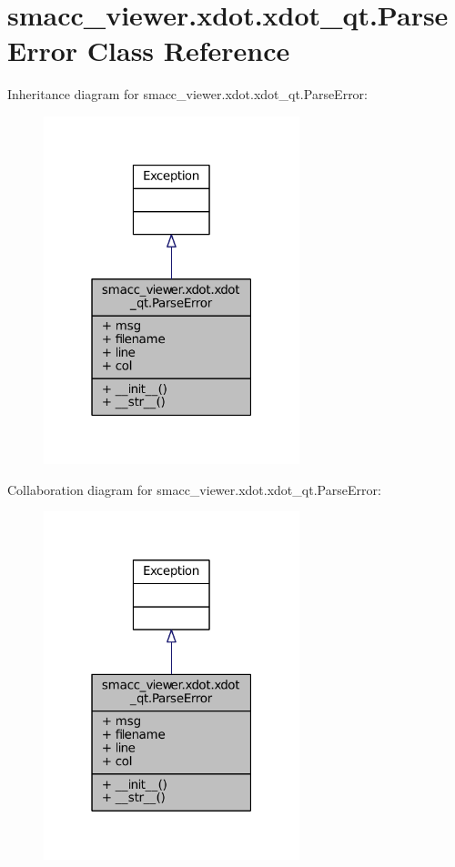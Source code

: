 \hypertarget{classsmacc__viewer_1_1xdot_1_1xdot__qt_1_1ParseError}{}\section{smacc\+\_\+viewer.\+xdot.\+xdot\+\_\+qt.\+Parse\+Error Class Reference}
\label{classsmacc__viewer_1_1xdot_1_1xdot__qt_1_1ParseError}


Inheritance diagram for smacc\+\_\+viewer.\+xdot.\+xdot\+\_\+qt.\+Parse\+Error\+:
\nopagebreak
\begin{figure}[H]
\begin{center}
\leavevmode
\includegraphics[width=211pt]{classsmacc__viewer_1_1xdot_1_1xdot__qt_1_1ParseError__inherit__graph}
\end{center}
\end{figure}


Collaboration diagram for smacc\+\_\+viewer.\+xdot.\+xdot\+\_\+qt.\+Parse\+Error\+:
\nopagebreak
\begin{figure}[H]
\begin{center}
\leavevmode
\includegraphics[width=211pt]{classsmacc__viewer_1_1xdot_1_1xdot__qt_1_1ParseError__coll__graph}
\end{center}
\end{figure}

